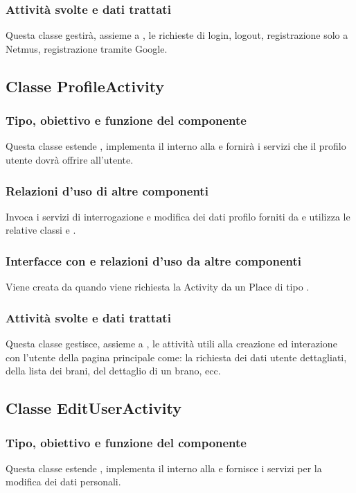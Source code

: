 \subsubsection*{Attivit\`a svolte e dati trattati}
Questa classe gestir\`a, assieme a , le richieste di login,
logout, registrazione solo a Netmus, registrazione tramite Google.

\subsection{Classe ProfileActivity}
\subsubsection*{Tipo, obiettivo e funzione del componente}
Questa classe estende , implementa il 
interno alla  e fornir\`a i servizi
che il profilo utente dovr\`a offrire all'utente.
\subsubsection*{Relazioni d'uso di altre componenti}
Invoca i servizi di interrogazione e modifica dei dati profilo forniti da
 e utilizza le relative classi  e
.
\subsubsection*{Interfacce con e relazioni d'uso da altre componenti}
Viene creata da  quando viene richiesta la Activity da
un Place di tipo .
\subsubsection*{Attivit\`a svolte e dati trattati}
Questa classe gestisce, assieme a , le attivit\`a utili alla
creazione ed interazione con l'utente della pagina principale come: la
richiesta dei dati utente dettagliati, della lista dei brani, del dettaglio di
un brano, ecc.

\subsection{Classe EditUserActivity}
\subsubsection*{Tipo, obiettivo e funzione del componente}
Questa classe estende , implementa il 
interno alla  e fornisce i servizi per la modifica dei dati
personali.

